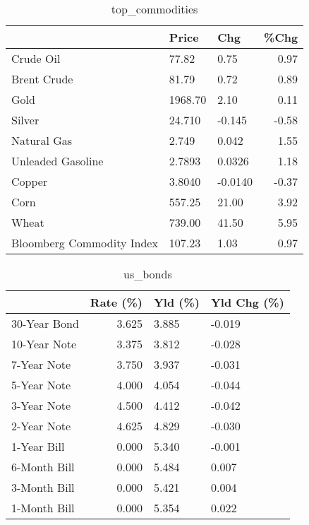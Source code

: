 \documentclass{article}%
\begin{document}
\begin{table}[htbp]%
\caption{top\_commodities}%
\centering%
\begin{adjustbox}{width=1\textwidth}%
\begin{tabular}{lllr}
\toprule
                          &   Price &     Chg &  \%Chg \\
\midrule
               Crude Oil  &   77.82 &    0.75 &  0.97 \\
             Brent Crude  &   81.79 &    0.72 &  0.89 \\
                    Gold  & 1968.70 &    2.10 &  0.11 \\
                  Silver  &  24.710 &  -0.145 & -0.58 \\
             Natural Gas  &   2.749 &   0.042 &  1.55 \\
       Unleaded Gasoline  &  2.7893 &  0.0326 &  1.18 \\
                  Copper  &  3.8040 & -0.0140 & -0.37 \\
                    Corn  &  557.25 &   21.00 &  3.92 \\
                   Wheat  &  739.00 &   41.50 &  5.95 \\
Bloomberg Commodity Index &  107.23 &    1.03 &  0.97 \\
\bottomrule
\end{tabular}
%
\end{adjustbox}%
\end{table}

%


\begin{table}[htbp]%
\caption{us\_bonds}%
\centering%
\begin{adjustbox}{width=1\textwidth}%
\begin{tabular}{lrll}
\toprule
             &  Rate (\%) & Yld (\%) & Yld Chg (\%) \\
\midrule
30-Year Bond &     3.625 &   3.885 &      -0.019 \\
10-Year Note &     3.375 &   3.812 &      -0.028 \\
 7-Year Note &     3.750 &   3.937 &      -0.031 \\
 5-Year Note &     4.000 &   4.054 &      -0.044 \\
 3-Year Note &     4.500 &   4.412 &      -0.042 \\
 2-Year Note &     4.625 &   4.829 &      -0.030 \\
 1-Year Bill &     0.000 &   5.340 &      -0.001 \\
6-Month Bill &     0.000 &   5.484 &       0.007 \\
3-Month Bill &     0.000 &   5.421 &       0.004 \\
1-Month Bill &     0.000 &   5.354 &       0.022 \\
\bottomrule
\end{tabular}
%
\end{adjustbox}%
\end{table}
\end{document}
